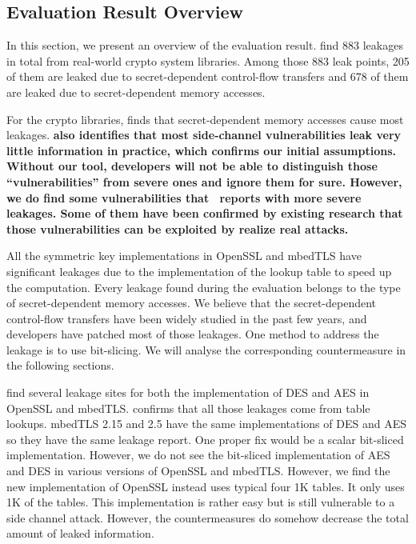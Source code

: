 \subsection{Evaluation Result Overview} \label{sec:eval_overview}
In this section, we present an overview of the evaluation result. 
\tool{} find 883 leakages in total from real-world crypto system libraries.
Among those 883 leak points, 205 of them are leaked due
to secret-dependent control-flow transfers and 678 of them are leaked 
due to secret-dependent memory accesses. 

For the crypto libraries, \tool{} finds that secret-dependent memory accesses 
cause most leakages. 
\textbf{
\tool{} also identifies that most side-channel vulnerabilities 
leak very little information in practice, which confirms our initial
assumptions.  Without our tool, developers will not be able to
distinguish those ``vulnerabilities'' from severe ones and ignore them for sure.
However, we do find some vulnerabilities that \tool\ reports with more severe leakages. 
Some of them have been confirmed by existing research that those 
vulnerabilities can be exploited by realize real attacks.} 

All the symmetric key implementations in OpenSSL and mbedTLS have
significant leakages due to the implementation of the lookup table
to speed up the computation. Every leakage found during the evaluation
belongs to the type of secret-dependent memory accesses. We believe that
the secret-dependent control-flow transfers have been widely studied in
the past few years, and developers have patched most of those leakages. 
One method to address the leakage is to use bit-slicing. We will analyse
the corresponding countermeasure in the following sections.

\tool{} find several leakage sites for both the implementation of DES and AES
in OpenSSL and mbedTLS\@. \tool{} confirms that all those leakages come from
table lookups. mbedTLS 2.15 and 2.5 have the same implementations
of DES and AES so they have the same leakage report. One proper fix would be 
a scalar bit-sliced implementation. However, we do not see the bit-sliced 
implementation of AES and DES in various versions of OpenSSL and mbedTLS\@.  
However, we find the new implementation of OpenSSL instead uses typical four 1K
tables. It only uses 1K of the tables. This implementation is rather easy but is
still vulnerable to a side channel attack. However, the countermeasures do
somehow decrease the total amount of leaked information.

